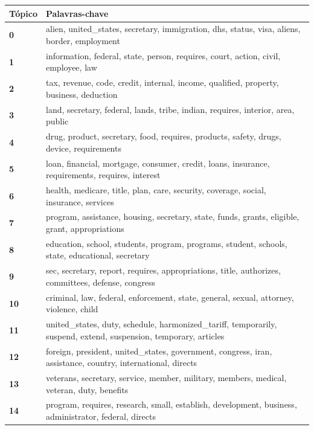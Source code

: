 \begin{table}[htpb]
    \centering
    \scriptsize
    \begin{tabularx}{\textwidth}{@{}l X@{}}
        \toprule
        \textbf{Tópico} & \textbf{Palavras-chave} \\
        \midrule
        \textbf{0} & alien, united\_states, secretary, immigration, dhs, status, visa, aliens, border, employment \\
        \textbf{1} & information, federal, state, person, requires, court, action, civil, employee, law \\
        \textbf{2} & tax, revenue, code, credit, internal, income, qualified, property, business, deduction \\
        \textbf{3} & land, secretary, federal, lands, tribe, indian, requires, interior, area, public \\
        \textbf{4} & drug, product, secretary, food, requires, products, safety, drugs, device, requirements \\
        \textbf{5} & loan, financial, mortgage, consumer, credit, loans, insurance, requirements, requires, interest \\
        \textbf{6} & health, medicare, title, plan, care, security, coverage, social, insurance, services \\
        \textbf{7} & program, assistance, housing, secretary, state, funds, grants, eligible, grant, appropriations \\
        \textbf{8} & education, school, students, program, programs, student, schools, state, educational, secretary \\
        \textbf{9} & sec, secretary, report, requires, appropriations, title, authorizes, committees, defense, congress \\
        \textbf{10} & criminal, law, federal, enforcement, state, general, sexual, attorney, violence, child \\
        \textbf{11} & united\_states, duty, schedule, harmonized\_tariff, temporarily, suspend, extend, suspension, temporary, articles \\
        \textbf{12} & foreign, president, united\_states, government, congress, iran, assistance, country, international, directs \\
        \textbf{13} & veterans, secretary, service, member, military, members, medical, veteran, duty, benefits \\
        \textbf{14} & program, requires, research, small, establish, development, business, administrator, federal, directs \\

\end{tabularx}
\end{table}
